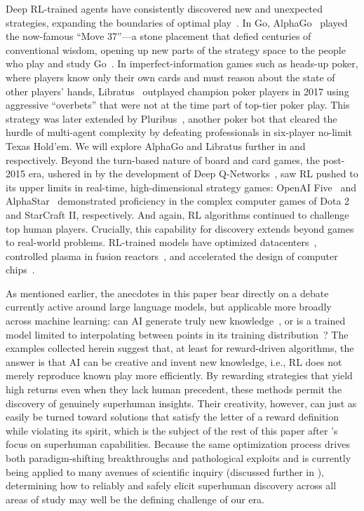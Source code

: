 \documentclass[10pt]{article}
\def\citep#1{}%
\begin{document}
Deep RL-trained agents have consistently discovered new and unexpected strategies, expanding the boundaries of optimal play~\citep{BrownLibratus2017, silver2018general, wurman2022outracing}.
In Go, AlphaGo~\citep{Silver2016} played the now-famous ``Move 37''---a stone placement that defied centuries of conventional wisdom, opening up new parts of the strategy space to the people who play and study Go~\citep{Shin2023Go, Silver2016}. 
In imperfect-information games such as heads-up poker, where players know only their own cards and must reason about the state of other players' hands, Libratus~\citep{Brown2018headsup} outplayed champion poker players in 2017 using aggressive ``overbets'' that were not at the time part of top-tier poker play.
This strategy was later extended by Pluribus~\citep{brown2019superhuman}, another poker bot that cleared the hurdle of multi-agent complexity by defeating professionals in six-player no-limit Texas Hold'em. 
We will explore AlphaGo and Libratus further in  and  respectively.
Beyond the turn-based nature of board and card games, the post-2015 era, ushered in by the development of Deep Q-Networks~\citep{mnih2015human}, saw RL pushed to its upper limits in real-time, high-dimensional strategy games:
OpenAI Five~\citep{openai2019dota2largescale} and AlphaStar~\citep{Vinyals2019Alphastar} demonstrated proficiency in the complex computer games of Dota 2 and StarCraft II, respectively. And again, RL algorithms continued to challenge top human players.
Crucially, this capability for discovery extends beyond games to real-world problems.
RL-trained models have optimized datacenters~\citep{luo2022controllingcommercialcoolingsystems}, controlled plasma in fusion reactors~\citep{Degrave2022tokamak}, and accelerated the design of computer chips~\citep{mirhoseini2021tpudesign}.

As mentioned earlier, the anecdotes in this paper bear directly on a debate currently active around large language models, but applicable more broadly across machine learning: can AI generate truly new knowledge~\citep{si2024llmsgeneratenovelresearch}, or is a trained model limited to interpolating between points in its training distribution~\citep{Gorban2018Interpolating, balestriero2021learninghighdimensionamounts}?
The examples collected herein suggest that, at least for reward-driven algorithms, the answer is that AI can be creative and invent new knowledge, i.e., RL does not merely reproduce known play more efficiently.
By rewarding strategies that yield high returns even when they lack human precedent, these methods permit the discovery of genuinely superhuman insights.
Their creativity, however, can just as easily be turned toward solutions that satisfy the letter of a reward definition while violating its spirit, which is the subject of the rest of this paper after 's focus on superhuman capabilities.
Because the same optimization process drives both paradigm-shifting breakthroughs and pathological exploits and is currently being applied to many avenues of scientific inquiry (discussed further in ), determining how to reliably and safely elicit superhuman discovery across all areas of study may well be the defining challenge of our era.
\end{document}
